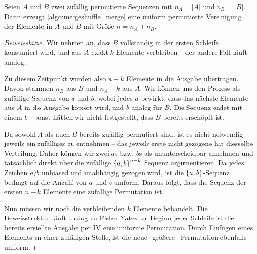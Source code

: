     \begin{theorem}
        Seien $A$ und $B$ zwei zufällig permutierte Sequenzen mit $n_A = |A|$ und $n_B = |B|$.
        Dann erzeugt \cref{algo:mergeshuffle_merge} eine uniform permutierte Vereinigung der Elemente in $A$ und $B$ mit Größe $n = n_A + n_B$.
    \end{theorem}

    \begin{proof}[Beweisskizze]
        Wir nehmen an, dass $B$ vollständig in der ersten Schleife konsumiert wird, und aus $A$ exakt $k$ Elemente verbleiben -- der andere Fall läuft analog.

        Zu diesem Zeitpunkt wurden also $n-k$ Elemente in die Ausgabe übertragen.
        Davon stammen $n_B$ aus $B$ und $n_A - k$ aus $A$.
        Wir können uns den Prozess als zufällige Sequenz von $a$ und $b$, wobei jedes $a$ bewirkt, dass das nächste Elemente aus $A$ in die Ausgabe kopiert wird, und $b$ analog für $B$.
        Die Sequenz endet mit einem $b$ -- sonst hätten wir nicht festgestellt, dass $B$ bereits erschöpft ist.

        Da sowohl $A$ als auch $B$ bereits zufällig permutiert sind, ist es nicht notwendig jeweils ein zufälliges zu entnehmen -- das jeweils erste nicht gezogene hat diesselbe Verteilung.
        Daher können wir zwei $a$s bzw. $b$s als ununterscheidbar annehmen und tatsächlich direkt über die zufällige $\left\{a,b\right\}^{n-k}$ Sequenz argumentieren.
        Da jedes Zeichen $a$/$b$ unbiased und unabhängig gezogen wird, ist die $\left\{a,b\right\}$-Sequenz bedingt auf die Anzahl von $a$ und $b$ uniform.
        Daraus folgt, dass die Sequenz der ersten $n - k$ Elemente eine zufällige Permutation ist.

        Nun müssen wir noch die verbleibenden $k$ Elemente behandelt.
        Die Beweisstruktur läuft analog zu Fisher Yates:
        zu Beginn jeder Schleife ist die bereits erstellte Ausgabe per IV eine uniforme Permutation.
        Durch Einfügen eines Elements an einer zufälligen Stelle, ist die neue --größere-- Permutation ebenfalls uniform.
    \end{proof}
\fi